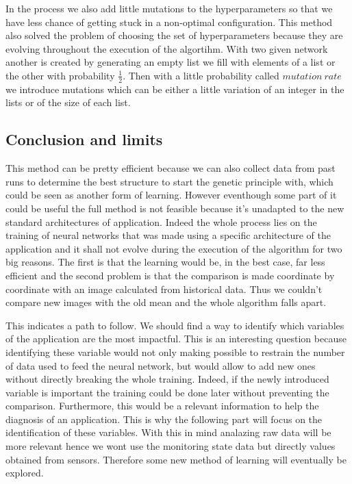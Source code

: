 \documentclass[10pt,a4paper,oneside]{article}
\begin{document}
\begin{multicols}{2}
In the process we also add little mutations to the hyperparameters so that we have less chance of getting stuck in a non-optimal configuration. This method also solved the problem of choosing the set of hyperparameters because they are evolving throughout the execution of the algortihm.
With two given network another is created by generating an empty list we fill with elements of a list or the other with probability $\frac{1}{2}$. Then with a little probability called $mutation ~rate$ we introduce mutations which can be either a little variation of an integer in the lists or of the size of each list.

\subsection{Conclusion and limits}
This method can be pretty efficient because we can also collect data from past runs to determine the best structure to start the genetic principle with, which could be seen as another form of learning. However eventhough some part of it could be useful the full method is not feasible because it's unadapted to the new standard architectures of application. Indeed the whole process lies on the training of neural networks that was made using a specific architecture of the application and it shall not evolve during the execution of the algorithm for two big reasons. The first is that the learning would be, in the best case, far less efficient and the second problem is that the comparison is made coordinate by coordinate with an image calculated from historical data. Thus we couldn't compare new images with the old mean and the whole algorithm falls apart.

This indicates a path to follow. We should find a way to identify which variables of the application are the most impactful. This is an interesting question because identifying these variable would not only making possible to restrain the number of data used to feed the neural network, but would allow to add new ones without directly breaking the whole training. Indeed, if the newly introduced variable is important the training could be done later without preventing the comparison. Furthermore, this would be a relevant information to help the diagnosis of an application. This is why the following part will focus on the identification of these variables. With this in mind analazing raw data will be more relevant hence we wont use the monitoring state data but directly values obtained from sensors. Therefore some new method of learning will eventually be explored.


\end{multicols}
\end{document}
